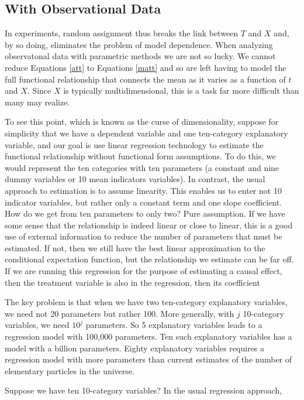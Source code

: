 \documentclass[11pt,titlepage]{article}
\begin{document}
\subsection{With Observational Data}

In experiments, random assignment thus breaks the link between $T$ and
$X$ and, by so doing, eliminates the problem of model dependence.
When analyzing observatonal data with parametric methods we are not so
lucky.  We cannot reduce Equations \ref{att} to Equations \ref{matt}
and so are left having to model the full functional relationship that
connects the mean as it varies as a function of $t$ and $X$.  Since
$X$ is typically multidimensional, this is a task far more difficult
than many may realize.

To see this point, which is known as the curse of dimensionality,
suppose for simplicity that we have a dependent variable and one
ten-category explanatory variable, and our goal is use linear
regression technology to estimate the functional relationship without
functional form assumptions.  To do this, we would represent the ten
categories with ten parameters (a constant and nine dummy variables or
10 mean indicators variables).  In contrast, the usual approach to
estimation is to assume linearity.  This enables us to enter not 10
indicator variables, but rather only a constant term and one slope
coefficient.  How do we get from ten parameters to only two?  Pure
assumption.  If we have some sense that the relationship is indeed
linear or close to linear, this is a good use of external information
to reduce the number of parameters that must be estimated.  If not,
then we still have the best linear approximation to the conditional
expectation function, but the relationship we estimate can be far off.
If we are running this regression for the purpose of estimating a
causal effect, then the treatment variable is also in the regression,
then its coefficient

The key problem is that when we have two ten-category explanatory
variables, we need not 20 parameters but rather 100.  More generally,
with $j$ 10-category variables, we need $10^j$ parameters.  So 5
explanatory variables leads to a regression model with 100,000
parameters.  Ten such explanatory variables has a model with a billion
parameters.  Eighty explanatory variables requires a regression model
with more parameters than current estimates of the number of
elementary particles in the universe.

  Suppose we have ten 10-category
variables?  In the usual regression approach, 
\end{document}
